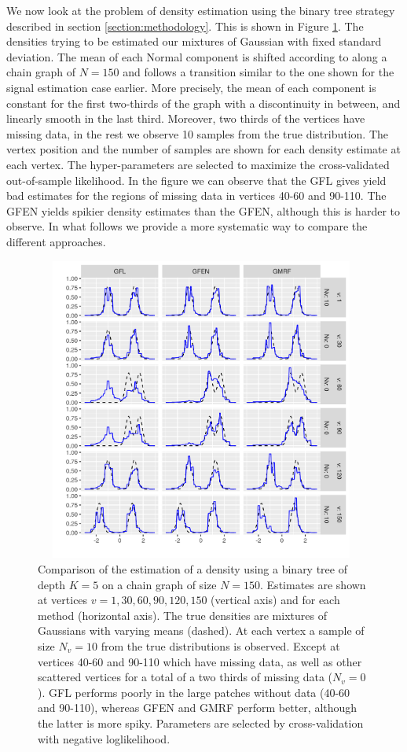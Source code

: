 \documentclass[a4paper, 11pt]{article}
\begin{document}
We now look at the problem of density estimation using the binary tree strategy described in section \ref{section:methodology}. This is shown in Figure \ref{fig:benchmarks-density}. The densities trying to be estimated our mixtures of Gaussian with fixed standard deviation. The mean of each Normal component is shifted according to along a chain graph of $N=150$ and follows a transition similar to the one shown for the signal estimation case earlier. More precisely, the mean of each component is constant for the first two-thirds of the graph with a discontinuity in between, and linearly smooth in the last third. Moreover, two thirds of the vertices have missing data, in the rest we observe 10 samples from the true distribution. The vertex position and the number of samples are shown for each density estimate at each vertex. The hyper-parameters are selected to maximize the cross-validated out-of-sample likelihood. In the figure we can observe that the GFL gives yield bad estimates for the regions of missing data in vertices 40-60 and 90-110. The GFEN yields spikier density estimates than the GFEN, although this is harder to observe. In what follows we provide a more systematic way to compare the different approaches.

\begin{figure}[tb]
    \centering
    \includegraphics[width=11cm, height=10cm]{img/benchmarks_densities_vertical.png}
    \caption{Comparison of the estimation of a density using a binary tree of depth $K=5$ on a chain graph of size $N=150$. Estimates are shown at vertices $v=1, 30, 60, 90, 120, 150$ (vertical axis) and for each method (horizontal axis). The true densities are mixtures of Gaussians with varying means (dashed). At each vertex a sample of size $N_v=10$ from the true distributions is observed. Except at vertices 40-60 and 90-110 which have missing data, as well as other scattered vertices for a total of a two thirds of missing data ($N_v=0$). GFL performs poorly in the large patches without data (40-60 and 90-110), whereas GFEN and GMRF perform better, although the latter is more spiky. Parameters are selected by cross-validation with negative loglikelihood.} 
    \label{fig:benchmarks-density}
\end{figure}
\end{document}
